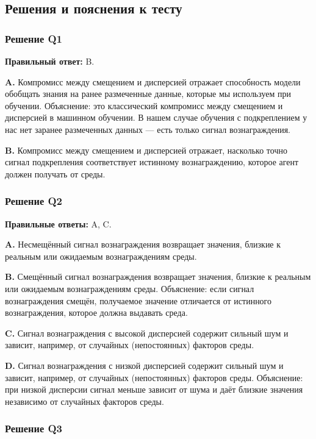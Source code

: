 \documentclass[11pt,a4paper]{article}
\begin{document}
\subsection{Решения и пояснения к тесту}\label{quiz-solutions-and-explanations}

\subsubsection{Решение Q1}\label{q1-solution}

\textbf{Правильный ответ:} B.

\textbf{A.} Компромисс между смещением и дисперсией отражает способность модели обобщать знания на ранее размеченные данные, которые мы используем при обучении. Объяснение: это классический компромисс между смещением и дисперсией в машинном обучении. В нашем случае обучения с подкреплением у нас нет заранее размеченных данных --- есть только сигнал вознаграждения.

\textbf{B.} Компромисс между смещением и дисперсией отражает, насколько точно сигнал подкрепления соответствует истинному вознаграждению, которое агент должен получать от среды.

\subsubsection{Решение Q2}\label{q2-solution}

\textbf{Правильные ответы:} A, C.

\textbf{A.} Несмещённый сигнал вознаграждения возвращает значения, близкие к реальным или ожидаемым вознаграждениям среды.

\textbf{B.} Смещённый сигнал вознаграждения возвращает значения, близкие к реальным или ожидаемым вознаграждениям среды. Объяснение: если сигнал вознаграждения смещён, получаемое значение отличается от истинного вознаграждения, которое должна выдавать среда.

\textbf{C.} Сигнал вознаграждения с высокой дисперсией содержит сильный шум и зависит, например, от случайных (непостоянных) факторов среды.

\textbf{D.} Сигнал вознаграждения с низкой дисперсией содержит сильный шум и зависит, например, от случайных (непостоянных) факторов среды. Объяснение: при низкой дисперсии сигнал меньше зависит от шума и даёт близкие значения независимо от случайных факторов среды.

\subsubsection{Решение Q3}\label{q3-solution}
\end{document}
